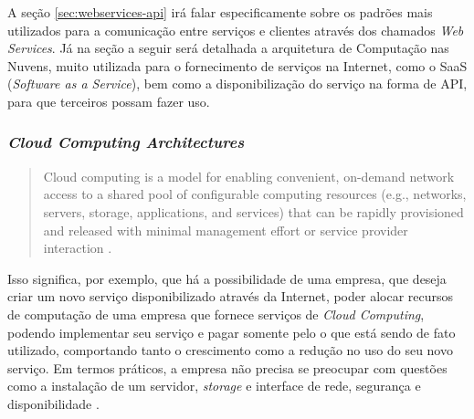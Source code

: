 \documentclass[diss]{template/setrem}
\begin{document}
A seção \ref{sec:webservices-api} irá falar especificamente sobre os padrões mais utilizados para a comunicação entre serviços e clientes através dos chamados \emph{Web Services}. Já na seção a seguir será detalhada a arquitetura de Computação nas Nuvens, muito utilizada para o fornecimento de serviços na Internet, como o SaaS (\emph{Software as a Service}), bem como a disponibilização do serviço na forma de API, para que terceiros possam fazer uso.

\subsubsection{\textit{Cloud Computing Architectures}}
\label{subsubsec:cloudcomputingarch}
\begin{quotation}
Cloud computing is a model for enabling convenient, on-demand network access to a shared pool of configurable computing resources (e.g., networks, servers, storage, applications, and services) that can be rapidly provisioned and released with minimal management effort or service provider interaction \citep{NIST2009}.
\end{quotation}

Isso significa, por exemplo, que há a possibilidade de uma empresa, que deseja criar um novo serviço disponibilizado através da Internet, poder alocar recursos de computação de uma empresa que fornece serviços de \emph{Cloud Computing}, podendo implementar seu serviço e pagar somente pelo o que está sendo de fato utilizado, comportando tanto o crescimento como a redução no uso do seu novo serviço. Em termos práticos, a empresa não precisa se preocupar com questões como a instalação de um servidor, \emph{storage} e interface de rede, segurança e disponibilidade \citep{Rodger2011}.
\end{document}
